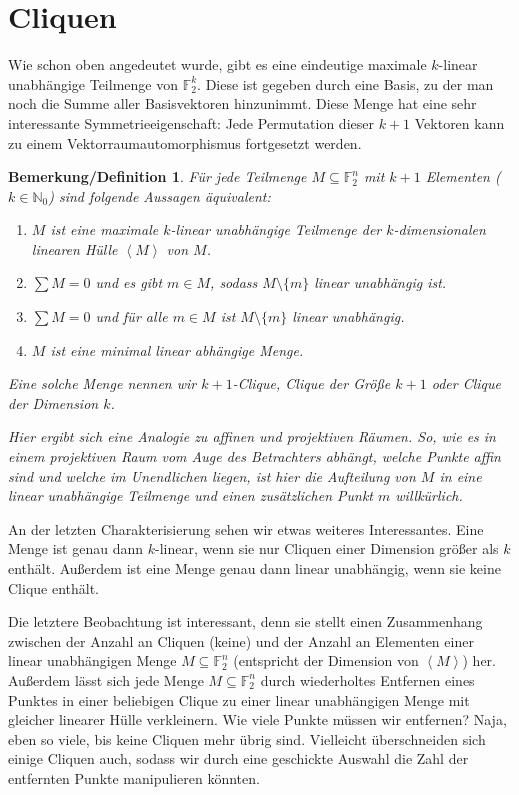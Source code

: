 \documentclass[a4paper]{scrartcl}
\theoremstyle{break}
\newtheorem{remdef}{Bemerkung/Definition}
\newcommand{\N}{\mathbb{N}}
\newcommand{\F}{\mathbb{F}}
\begin{document}
\section{Cliquen}

Wie schon oben angedeutet wurde, gibt es eine eindeutige maximale $k$-linear unabhängige Teilmenge von $\F_2^k$. Diese ist gegeben durch eine Basis, zu der man noch die Summe aller Basisvektoren hinzunimmt. Diese Menge hat eine sehr interessante Symmetrieeigenschaft: Jede Permutation dieser $k+1$ Vektoren kann zu einem Vektorraumautomorphismus fortgesetzt werden.

\begin{remdef}
  Für jede Teilmenge $M \subseteq \F_2^n$ mit $k+1$ Elementen ($k \in \N_0$) sind folgende Aussagen äquivalent:
  \begin{enumerate}
  \item $M$ ist eine maximale $k$-linear unabhängige Teilmenge der $k$-dimensionalen linearen Hülle $\left<M\right>$ von $M$.
  \item $\sum M = 0$ und es gibt $m\in M$, sodass $M\setminus\{m\}$ linear unabhängig ist.
  \item $\sum M = 0$ und für alle $m \in M$ ist $M\setminus\{m\}$ linear unabhängig.
  \item $M$ ist eine minimal linear abhängige Menge.
  \end{enumerate}

  Eine solche Menge nennen wir $k+1$-Clique, Clique der Größe $k+1$ oder Clique der Dimension $k$.

  Hier ergibt sich eine Analogie zu affinen und projektiven Räumen. So, wie es in einem projektiven Raum
  vom Auge des Betrachters abhängt, welche Punkte affin sind und welche im Unendlichen liegen,
  ist hier die Aufteilung von $M$ in eine linear unabhängige Teilmenge und einen zusätzlichen Punkt $m$ willkürlich.
\end{remdef}

An der letzten Charakterisierung sehen wir etwas weiteres Interessantes.
Eine Menge ist genau dann $k$-linear, wenn sie nur Cliquen einer Dimension größer als $k$ enthält.
Außerdem ist eine Menge genau dann linear unabhängig, wenn sie keine Clique enthält.

Die letztere Beobachtung ist interessant, denn sie stellt einen Zusammenhang zwischen der Anzahl an Cliquen (keine)
und der Anzahl an Elementen einer linear unabhängigen Menge $M \subseteq \F_2^n$ (entspricht der Dimension von $\left<M\right>$) her.
Außerdem lässt sich jede Menge $M \subseteq \F_2^n$ durch wiederholtes Entfernen eines Punktes in einer beliebigen Clique
zu einer linear unabhängigen Menge mit gleicher linearer Hülle verkleinern.
Wie viele Punkte müssen wir entfernen? Naja, eben so viele, bis keine Cliquen mehr übrig sind.
Vielleicht überschneiden sich einige Cliquen auch, sodass wir durch eine geschickte Auswahl die Zahl der entfernten Punkte
manipulieren könnten.
\end{document}
